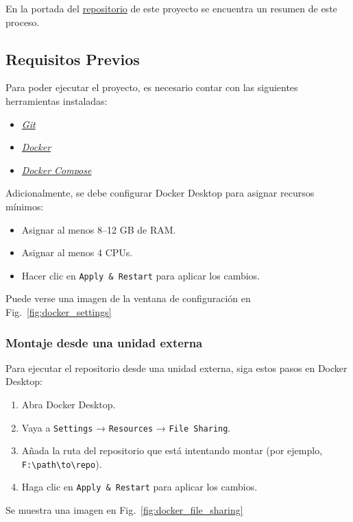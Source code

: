 En la portada del \href{https://github.com/pac1006/IAGScore/tree/main}{repositorio} de este proyecto se encuentra un resumen de este proceso.

\subsection{Requisitos Previos}

Para poder ejecutar el proyecto, es necesario contar con las siguientes herramientas instaladas:

\begin{itemize}
    \item \href{https://git-scm.com/}{\textit{Git}}
    \item \href{https://www.docker.com/}{\textit{Docker}}
    \item \href{https://docs.docker.com/compose/}{\textit{Docker Compose}}
\end{itemize}

Adicionalmente, se debe configurar Docker Desktop para asignar recursos mínimos:
\begin{itemize}
    \item Asignar al menos 8–12 GB de RAM.
    \item Asignar al menos 4 CPUs.
    \item Hacer clic en \texttt{Apply \& Restart} para aplicar los cambios.
\end{itemize}
Puede verse una imagen de la ventana de configuración en Fig.~\ref{fig:docker_settings}

\subsubsection*{Montaje desde una unidad externa}

Para ejecutar el repositorio desde una unidad externa, siga estos pasos en Docker Desktop:
\begin{enumerate}
    \item Abra Docker Desktop.
    \item Vaya a \texttt{Settings} → \texttt{Resources} → \texttt{File Sharing}.
    \item Añada la ruta del repositorio que está intentando montar (por ejemplo, \texttt{F:\textbackslash path\textbackslash to\textbackslash repo}).
    \item Haga clic en \texttt{Apply \& Restart} para aplicar los cambios.
\end{enumerate}
Se muestra una imagen en Fig.~\ref{fig:docker_file_sharing}

